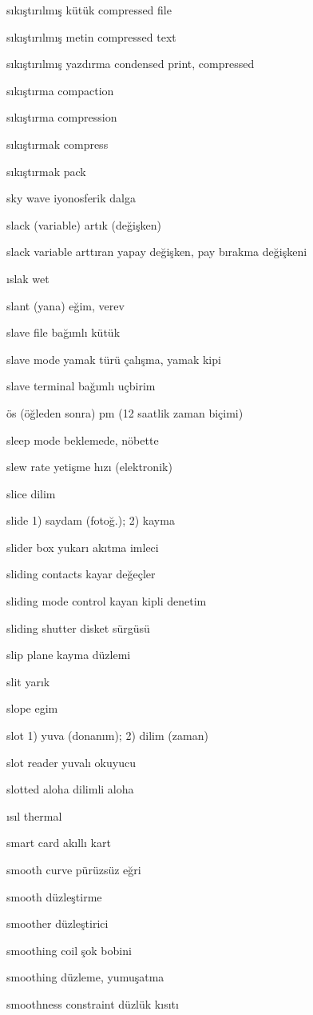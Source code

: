 \documentclass[12pt,fleqn]{article}\usepackage{../../common}
\begin{document}
sıkıştırılmış kütük compressed file

sıkıştırılmış metin compressed text

sıkıştırılmış yazdırma condensed print, compressed

sıkıştırma compaction

sıkıştırma compression

sıkıştırmak compress

sıkıştırmak pack

sky wave iyonosferik dalga

slack (variable) artık (değişken)

slack variable arttıran yapay değişken, pay bırakma değişkeni

ıslak wet

slant (yana) eğim, verev

slave file bağımlı kütük

slave mode yamak türü çalışma, yamak kipi

slave terminal bağımlı uçbirim

ös (öğleden sonra) pm (12 saatlik zaman biçimi)

sleep mode beklemede, nöbette

slew rate yetişme hızı (elektronik)

slice dilim

slide 1) saydam (fotoğ.); 2) kayma

slider box yukarı akıtma imleci

sliding contacts kayar değeçler

sliding mode control kayan kipli denetim

sliding shutter disket sürgüsü

slip plane kayma düzlemi

slit yarık

slope egim

slot 1) yuva (donanım); 2) dilim (zaman)

slot reader yuvalı okuyucu

slotted aloha dilimli aloha

ısıl thermal

smart card akıllı kart

smooth curve pürüzsüz eğri

smooth düzleştirme

smoother düzleştirici

smoothing coil şok bobini

smoothing düzleme, yumuşatma

smoothness constraint düzlük kısıtı
\end{document}
